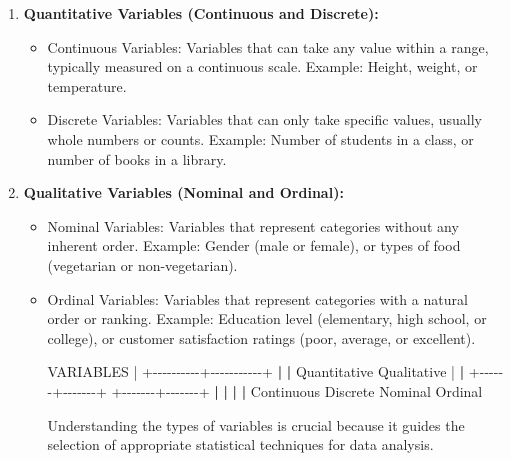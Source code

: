 \documentclass[
]{book}
\newenvironment{Shaded}{\begin{snugshade}}{\end{snugshade}}
\newcommand{\ErrorTok}[1]{\textcolor[rgb]{0.64,0.00,0.00}{\textbf{#1}}}
\newcommand{\NormalTok}[1]{#1}
\newcommand{\SpecialCharTok}[1]{\textcolor[rgb]{0.00,0.00,0.00}{#1}}
\begin{document}
\begin{enumerate}
\def\labelenumi{\arabic{enumi}.}
\item
  \textbf{Quantitative Variables (Continuous and Discrete):}

  \begin{itemize}
  \item
    Continuous Variables: Variables that can take any value within a range, typically measured on a continuous scale. Example: Height, weight, or temperature.
  \item
    Discrete Variables: Variables that can only take specific values, usually whole numbers or counts. Example: Number of students in a class, or number of books in a library.
  \end{itemize}
\item
  \textbf{Qualitative Variables (Nominal and Ordinal):}

  \begin{itemize}
  \item
    Nominal Variables: Variables that represent categories without any inherent order. Example: Gender (male or female), or types of food (vegetarian or non-vegetarian).
  \item
    Ordinal Variables: Variables that represent categories with a natural order or ranking. Example: Education level (elementary, high school, or college), or customer satisfaction ratings (poor, average, or excellent).

\begin{Shaded}
\begin{Highlighting}[]
\NormalTok{                   VARIABLES}
                       \SpecialCharTok{|}
            \SpecialCharTok{+{-}{-}{-}{-}{-}{-}{-}{-}{-}{-}+{-}{-}{-}{-}{-}{-}{-}{-}{-}{-}{-}+}
            \ErrorTok{|}                      \ErrorTok{|}
\NormalTok{      Quantitative           Qualitative}
            \SpecialCharTok{|}                      \ErrorTok{|}
     \SpecialCharTok{+{-}{-}{-}{-}{-}{-}+{-}{-}{-}{-}{-}{-}{-}+}      \SpecialCharTok{+{-}{-}{-}{-}{-}{-}{-}+{-}{-}{-}{-}{-}{-}{-}+}
     \ErrorTok{|}              \ErrorTok{|}      \ErrorTok{|}               \ErrorTok{|}
\NormalTok{Continuous    Discrete   Nominal      Ordinal}
\end{Highlighting}
\end{Shaded}

    Understanding the types of variables is crucial because it guides the selection of appropriate statistical techniques for data analysis.
  \end{itemize}
\end{enumerate}
\end{document}
